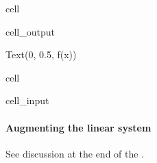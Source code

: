 \documentclass[letterpaper,10pt,english]{jupyterBook}
\begin{document}
\begin{sphinxuseclass}{cell}
\begin{sphinxVerbatimOutput}
\begin{sphinxuseclass}{cell_output}
\begin{sphinxVerbatim}[commandchars=\\\{\}]
Text(0, 0.5, \PYGZsq{}f(x)\PYGZsq{})
\end{sphinxVerbatim}

\noindent{}

\end{sphinxuseclass}\end{sphinxVerbatimOutput}

\end{sphinxuseclass}
\begin{sphinxuseclass}{cell}\begin{sphinxVerbatimInput}

\begin{sphinxuseclass}{cell_input}
\begin{sphinxVerbatim}[commandchars=\\\{\}]
\end{sphinxVerbatim}

\end{sphinxuseclass}\end{sphinxVerbatimInput}

\end{sphinxuseclass}

\paragraph{Augmenting the linear system}
\label{\detokenize{ch/pde/fem-poisson-1d:augmenting-the-linear-system}}
\sphinxAtStartPar
See discussion at the end of the {\hyperref[\detokenize{ch/pde/fvm-poisson-1d:pde-fvm-poisson-1d}]{}}.
\end{document}
